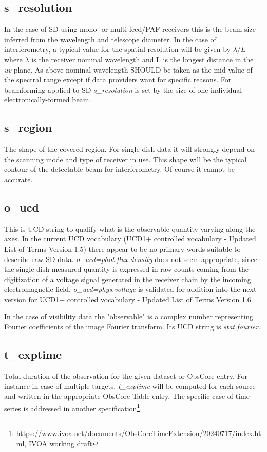 \documentclass[11pt,a4paper]{ivoa}
\begin{document}
\subsection{s\_resolution}
\label{sec:res}
In the case of SD using mono- or multi-feed/PAF receivers this is the beam size inferred from the wavelength and telescope diameter.
In the case of interferometry, a typical value for the spatial resolution will be given by $\lambda / L$ where $\lambda$
is the %
receiver nominal wavelength and L is the longest distance in the \emph{uv} plane.
As above nominal wavelength SHOULD be taken as the mid value of the spectral range except if data providers want  
for specific reasons. 
For beamforming applied to SD \emph{s\_resolution} is set by the size of one individual electronically-formed beam.
 
\subsection{s\_region}
The shape of the covered region. 
For single dish data it will strongly depend on the scanning mode and type of receiver in use.
This shape will be the typical contour of the detectable beam for interferometry. Of course it cannot be accurate.

\subsection{o\_ucd}
This is UCD string  to qualify what is the observable quantity varying along the axes. 
In the current UCD vocabulary (UCD1+ controlled vocabulary - Updated List of Terms Version 1.5) there appear to be no primary words suitable to describe raw SD data. \emph{o\_ucd=phot.flux.density} does not seem appropriate, since the single dish measured quantity is expressed in raw counts coming from the digitization of a voltage signal generated in the receiver chain by the incoming electromagnetic field. 
\emph{o\_ucd=phys.voltage} is validated for addition into the next version for UCD1+ controlled vocabulary - Updated List of Terms Version 1.6.

In the case of visibility data the "observable" is a complex number representing Fourier
coefficients of the image Fourier transform. Its UCD string is \emph{stat.fourier}.

\subsection{t\_exptime}
Total duration of the observation for the given dataset or ObsCore entry. For instance  in case of multiple targets, \emph{t\_exptime}
will be computed for each source and written in the appropriate ObsCore Table entry. The specific case of time series is addressed in another
specification\footnote{https://www.ivoa.net/documents/ObsCoreTimeExtension/20240717/index.html, IVOA working draft}.
\end{document}

